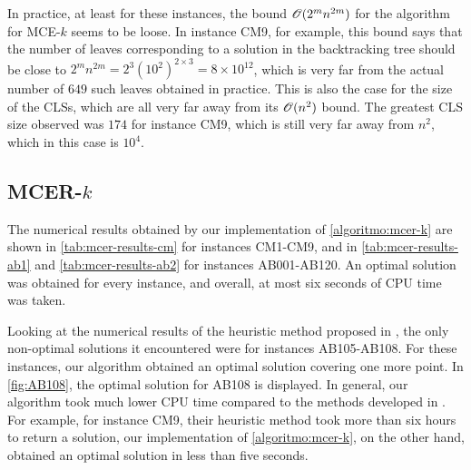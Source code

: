 In practice, at least for these instances, the bound $\mathscr{O}(2^mn^{2m})$ for the algorithm for MCE-$k$ seems to be loose. In instance CM9, for example, this bound says that the number of leaves corresponding to a solution in the backtracking tree should be close to $2^mn^{2m} = 2^3(10^2)^{2\times 3} = 8\times10^{12}$, which is very far from the actual number of $649$ such leaves obtained in practice.
This is also the case for the size of the CLSs, which are all very far away from its $\mathscr{O}(n^2)$ bound. The greatest CLS size observed was $174$ for instance CM9, which is still very far away from $n^2$, which in this case is $10^4$.

\subsection{MCER-$k$}

The numerical results obtained by our implementation of \autoref{algoritmo:mcer-k} are shown in \autoref{tab:mcer-results-cm} for instances CM1-CM9, and in \autoref{tab:mcer-results-ab1} and \autoref{tab:mcer-results-ab2} for instances AB001-AB120. 
An optimal solution was obtained for every instance, and overall, at most six seconds of CPU time was taken.

Looking at the numerical results of the heuristic method proposed in , the only non-optimal solutions it encountered were for instances AB105-AB108. For these instances, our algorithm obtained an optimal solution covering one more point. In \autoref{fig:AB108}, the optimal solution for AB108 is displayed.
In general, our algorithm took much lower CPU time compared to the methods developed in . For example, for instance CM9, their heuristic method took more than six hours to return a solution, our implementation of \autoref{algoritmo:mcer-k}, on the other hand, obtained an optimal solution in less than five seconds.

